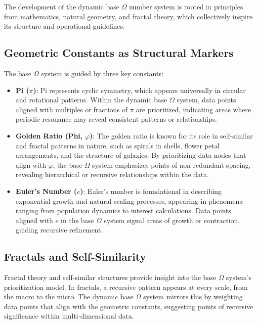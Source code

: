 \documentclass{article}
\begin{document}
The development of the dynamic base $\Omega$ number system is rooted in principles from mathematics, natural geometry, and fractal theory, which collectively inspire its structure and operational guidelines.

\subsection{Geometric Constants as Structural Markers}

The base $\Omega$ system is guided by three key constants:

\begin{itemize}
    \item \textbf{Pi ($\pi$)}: Pi represents cyclic symmetry, which appears universally in circular and rotational patterns. Within the dynamic base $\Omega$ system, data points aligned with multiples or fractions of $\pi$ are prioritized, indicating areas where periodic resonance may reveal consistent patterns or relationships.
    \item \textbf{Golden Ratio (Phi, $\varphi$)}: The golden ratio is known for its role in self-similar and fractal patterns in nature, such as spirals in shells, flower petal arrangements, and the structure of galaxies. By prioritizing data nodes that align with $\varphi$, the base $\Omega$ system emphasizes points of non-redundant spacing, revealing hierarchical or recursive relationships within the data.
    \item \textbf{Euler’s Number ($e$)}: Euler's number is foundational in describing exponential growth and natural scaling processes, appearing in phenomena ranging from population dynamics to interest calculations. Data points aligned with $e$ in the base $\Omega$ system signal areas of growth or contraction, guiding recursive refinement.
\end{itemize}

\subsection{Fractals and Self-Similarity}

Fractal theory and self-similar structures provide insight into the base $\Omega$ system’s prioritization model. In fractals, a recursive pattern appears at every scale, from the macro to the micro. The dynamic base $\Omega$ system mirrors this by weighting data points that align with the geometric constants, suggesting points of recursive significance within multi-dimensional data.
\end{document}

